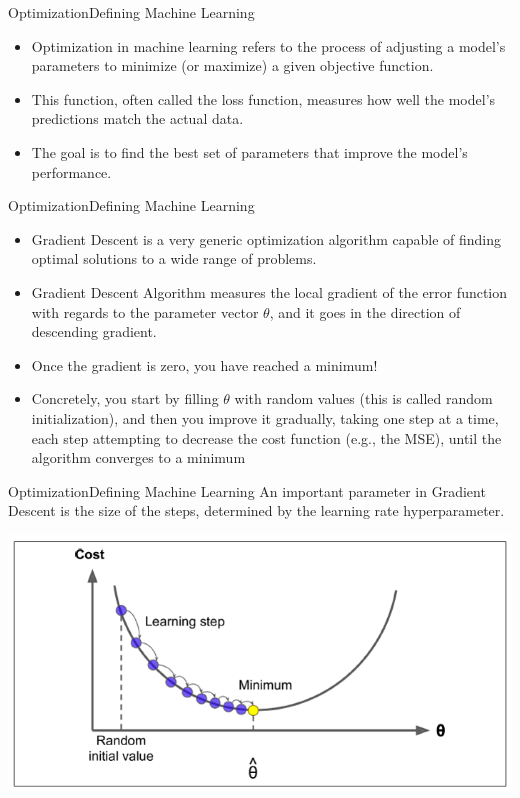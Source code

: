 \documentclass[11pt]{beamer}
\begin{document}
\begin{frame}{Optimization}{Defining Machine Learning}
    \begin{itemize}
        \item Optimization in machine learning refers to the process of adjusting a model’s parameters to minimize (or maximize) a given objective function. 
        \item This function, often called the loss function, measures how well the model's predictions match the actual data. 
        \item The goal is to find the best set of parameters that improve the model’s performance.
    \end{itemize}
\end{frame}
\begin{frame}{Optimization}{Defining Machine Learning}
   \begin{itemize}
      \item   				  						  
		Gradient Descent is a very generic optimization algorithm capable of finding optimal solutions to a wide range of problems. 
	  \item Gradient Descent Algorithm measures the local gradient of the error function with regards to the parameter vector $\theta$, and it goes in the direction of descending gradient. 
	  \item Once the gradient is zero, you have reached a minimum!
      \item Concretely, you start by filling $\theta$ with random values (this is called random initialization), and then you improve it gradually, taking one step at a time, each step attempting to decrease the cost function (e.g., the MSE), until the algorithm converges to a minimum		  
   \end{itemize}
\end{frame}
\begin{frame}{Optimization}{Defining Machine Learning}
An important parameter in Gradient Descent is the size of the steps, determined by
the learning rate hyperparameter. 
   \begin{center}
   \includegraphics[scale=.6]{../05-pictures/lesson-1-1_pic_8.png} 	
   \end{center}
\end{frame}
\end{document}
